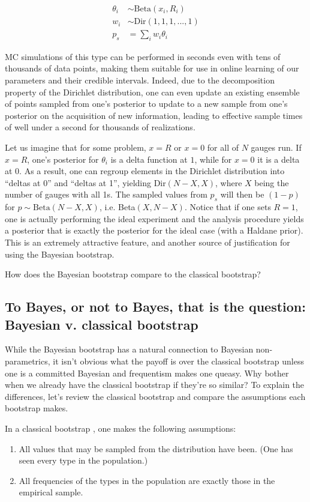 \begin{align*}
\theta_i &\sim \mathrm{Beta}(x_i,R_i) \\
w_i &\sim \mathrm{Dir}(1,1,1,...,1) \\
p_s &= \sum_i w_i \theta_i
\end{align*}


MC simulations of this type can be performed in seconds even with tens of thousands of data points, making them suitable for use in online learning of our parameters and their credible  intervals. Indeed, due to the decomposition property of the Dirichlet distribution, one can even update an existing ensemble of points sampled from one's posterior to update to a new sample from one's posterior on the acquisition of new information, leading to effective sample times of well under a second for thousands of realizations.

Let us imagine that for some problem, $x=R$ or $x=0$ for all of $N$ gauges run. If $x=R$, one's posterior for $\theta_i$ is a delta function at $1$, while for $x=0$ it is a delta at $0$. As a result, one can regroup elements in the Dirichlet distribution into ``deltas at 0'' and ``deltas at 1'', yielding Dir$(N-X,X)$, where $X$ being the number of gauges with all 1s. The sampled values from $p_s$ will then be $(1-p)$ for $p\sim \mathrm{Beta}(N-X,X)$, i.e. Beta$(X,N-X)$. Notice that if one sets $R=1$, one is actually performing the ideal experiment and the analysis procedure yields a posterior that is exactly the posterior for the ideal case (with a Haldane prior). This is an extremely attractive feature, and another source of justification for using the Bayesian bootstrap.

How does the Bayesian bootstrap compare to the classical bootstrap?

\subsection{To Bayes, or not to Bayes, that is the question: Bayesian v. classical bootstrap}
While the Bayesian bootstrap has a natural connection to Bayesian non-parametrics, it isn't obvious what the payoff is over the classical bootstrap unless one is a committed Bayesian and frequentism makes one queasy. Why bother when we already have the classical bootstrap if they're so similar? To explain the differences, let's review the classical bootstrap and compare the assumptions each bootstrap makes.

In a classical bootstrap \cite{efron1992bootstrap}, one makes the following assumptions:
\begin{enumerate}
	\item All values that may be sampled from the distribution have been. (One has seen every type in the population.)
	\item All frequencies of the types in the population are exactly those in the empirical sample.
\end{enumerate}

